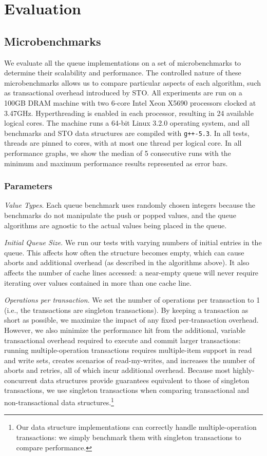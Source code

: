 \section{Evaluation}

\subsection{Microbenchmarks}
\label{q_microbenchmarks}

We evaluate all the queue implementations on a set of microbenchmarks to determine their scalability and performance. The controlled nature of these microbenchmarks allows us to compare particular aspects of each algorithm, such as transactional overhead introduced by STO. All experiments are run on a 100GB DRAM machine with two 6-core Intel Xeon X5690 processors clocked at 3.47GHz. Hyperthreading is enabled in each processor, resulting in 24 available logical cores. The machine runs a 64-bit Linux 3.2.0 operating system, and all benchmarks and STO data structures are compiled with \texttt{g++-5.3}. In all tests, threads are pinned to cores, with at most one thread per logical core.
In all performance graphs, we show the median of 5 consecutive runs with the minimum and maximum performance results represented as error bars.

\subsubsection{Parameters}

\emph{Value Types}. Each queue benchmark uses randomly chosen integers because the benchmarks do not manipulate the push or popped values, and the queue algorithms are agnostic to the actual values being placed in the queue.

\emph{Initial Queue Size}. We run our tests with varying numbers of initial entries in the queue. This affects how often the structure becomes empty, which can cause aborts and additional overhead (as described in the algorithms above). It also affects the number of cache lines accessed: a near-empty queue will never require iterating over values contained in more than one cache line.

\emph{Operations per transaction}. We set the number of operations per transaction to 1 (i.e., the transactions are singleton transactions). By keeping a transaction as short as possible, we maximize the impact of any fixed per-transaction overhead. However, we also minimize the performance hit from the additional, variable transactional overhead required to execute and commit larger transactions: running multiple-operation transactions requires multiple-item support in read and write sets, creates scenarios of read-my-writes, and increases the number of aborts and retries, all of which incur additional overhead. 
Because most highly-concurrent data structures provide guarantees equivalent to those of singleton transactions, we use singleton transactions when comparing transactional and non-transactional data structures.\footnote{Our data structure implementations can correctly handle multiple-operation transactions: we simply benchmark them with singleton transactions to compare performance.}

